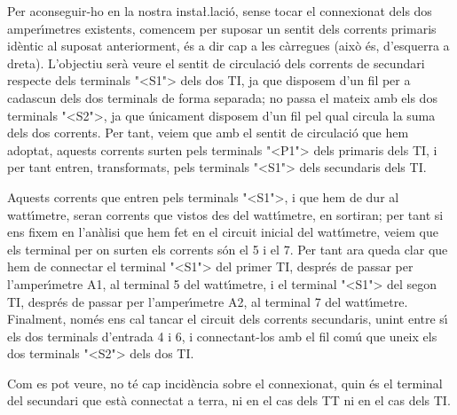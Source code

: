 Per aconseguir-ho en la nostra insta{\l.l}aci\'{o}, sense tocar el
connexionat dels dos amper\'{\i}metres existents, comencem per suposar un
sentit dels corrents primaris id\`{e}ntic al suposat anteriorment, \'{e}s a
dir cap a les c\`{a}rregues (aix\`{o} \'{e}s, d'esquerra a dreta). L'objectiu
ser\`{a} veure el sentit de circulaci\'{o} dels corrents de secundari
respecte dels terminals {"<}\textsf{S1}{">} dels dos TI, ja que disposem d'un fil per
a cadascun dels dos terminals de forma separada; no passa el mateix
amb els dos terminals {"<}\textsf{S2}{">}, ja que \'{u}nicament disposem d'un fil pel
qual circula la suma dels dos corrents. Per tant, veiem que amb el
sentit de circulaci\'{o} que hem adoptat, aquests corrents surten pels
terminals {"<}\textsf{P1}{">} dels primaris dels TI, i per tant entren, transformats,
pels terminals {"<}\textsf{S1}{">} dels secundaris dels TI.

Aquests corrents que entren pels terminals {"<}\textsf{S1}{">}, i que hem de dur al
watt\'{\i}metre, seran corrents que vistos des del watt\'{\i}metre, en
sortiran; per tant si ens fixem en l'an\`{a}lisi que hem fet en el
circuit inicial del watt\'{\i}metre, veiem que els terminal per on surten
els corrents s\'{o}n el 5 i el 7. Per tant ara queda clar que hem de
connectar el terminal {"<}\textsf{S1}{">} del primer TI, despr\'{e}s de passar per
l'amper\'{\i}metre \textsf{A1}, al terminal 5 del watt\'{\i}metre, i el
terminal {"<}\textsf{S1}{">} del segon TI, despr\'{e}s de passar per l'amper\'{\i}metre
\textsf{A2}, al terminal 7 del watt\'{\i}metre. Finalment, nom\'{e}s ens cal
tancar el circuit dels corrents secundaris, unint entre s\'{\i} els dos
terminals d'entrada 4  i 6, i connectant-los amb el fil com\'{u} que
uneix els dos terminals {"<}\textsf{S2}{">} dels dos TI.

Com es pot veure, no t\'{e} cap incid\`{e}ncia sobre el connexionat, quin \'{e}s
el terminal del secundari que est\`{a} connectat a terra, ni en el cas
dels TT ni en el cas dels TI.

